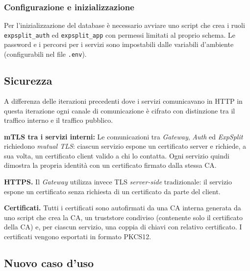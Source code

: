 \subsubsection{Configurazione e inizializzazione}
Per l'inizializzazione del database è necessario avviare uno script che crea i ruoli \texttt{expsplit\_auth} ed \texttt{expsplit\_app} con permessi limitati al proprio schema. Le password e i percorsi per i servizi sono impostabili dalle variabili d'ambiente (configurabili nel file \texttt{.env}).

\subsection{Sicurezza}
A differenza delle iterazioni precedenti dove i servizi comunicavano in HTTP in questa iterazione ogni canale di comunicazione è cifrato con distinzione tra il traffico interno e il traffico pubblico.

\textbf{mTLS tra i servizi interni:} Le comunicazioni tra \emph{Gateway}, \emph{Auth} ed \emph{ExpSplit} richiedono \emph{mutual TLS}: ciascun servizio espone un certificato server e richiede, a sua volta, un certificato client valido a chi lo contatta. Ogni servizio quindi dimostra la propria identità con un certificato firmato dalla stessa CA.

\textbf{HTTPS.} Il \emph{Gateway} utilizza invece TLS \emph{server-side} tradizionale: il servizio espone un certificato senza richiesta di un certificato da parte del client.

\textbf{Certificati.} Tutti i certificati sono autofirmati da una CA interna generata da uno script che crea la CA, un truststore condiviso (contenente solo il certificato della CA) e, per ciascun servizio, una coppia di chiavi con relativo certificato. I certificati vengono esportati in formato PKCS12.

\subsection{Nuovo caso d'uso}

